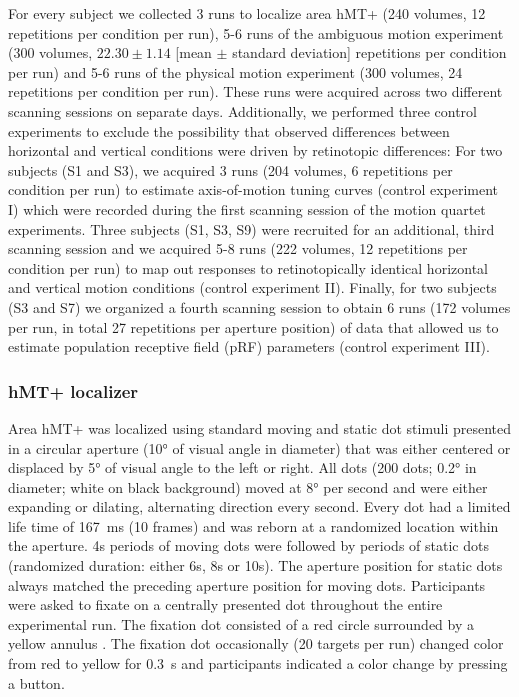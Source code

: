 For every subject we collected 3 runs to localize area hMT+ (240 volumes, 12 repetitions per condition per run), 5-6 runs of the ambiguous motion experiment (300 volumes, $ 22.30 \pm 1.14$ [mean $\pm$ standard deviation] repetitions per condition per run) and 5-6 runs of the physical motion experiment (300 volumes, 24 repetitions per condition per run). These runs were acquired across two different scanning sessions on separate days. Additionally, we performed three control experiments to exclude the possibility that observed differences between horizontal and vertical conditions were driven by retinotopic differences: For two subjects (S1 and S3), we acquired 3 runs (204 volumes, 6 repetitions per condition per run) to estimate axis-of-motion tuning curves (control experiment I) which were recorded during the first scanning session of the motion quartet experiments. Three subjects (S1, S3, S9) were recruited for an additional, third scanning session and we acquired 5-8 runs (222 volumes, 12 repetitions per condition per run) to map out responses to retinotopically identical horizontal and vertical motion conditions (control experiment II). Finally, for two subjects (S3 and S7) we organized a fourth scanning session to obtain 6 runs (172 volumes per run, in total 27 repetitions per aperture position) of data that allowed us to estimate population receptive field (pRF) parameters (control experiment III).

\subsubsection{hMT+ localizer}
Area hMT+ was localized using standard moving and static dot stimuli \parencite{Huk2002, Amano2009, Emmerling2016} presented in a circular aperture (10° of visual angle in diameter) that was either centered or displaced by 5° of visual angle to the left or right. All dots (200 dots; 0.2° in diameter; white on black background) moved at 8° per second and were either expanding or dilating, alternating direction every second. Every dot had a limited life time of 167~ms (10 frames) and was reborn at a randomized location within the aperture. 4s periods of moving dots were followed by periods of static dots (randomized duration: either 6s, 8s or 10s). The aperture position for static dots always matched the preceding aperture position for moving dots. Participants were asked to fixate on a centrally presented dot throughout the entire experimental run. The fixation dot consisted of a red circle surrounded by a yellow annulus \parencite{Marquardt2018}. The fixation dot occasionally (20 targets per run) changed color from red to yellow for 0.3~s and participants indicated a color change by pressing a button.

